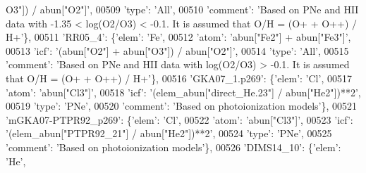 \begin{DoxyCode}
{      O3"]) / abun["O2"]'},
00509                                       \textcolor{stringliteral}{'type'}: \textcolor{stringliteral}{'All'},
00510                                       \textcolor{stringliteral}{'comment'}: \textcolor{stringliteral}{'Based on PNe and HII data with -1.35 < log(O2/O3) < -0.1.
       It is assumed that O/H = (O+ + O++) / H+'}\},
00511                          \textcolor{stringliteral}{'RR05\_4'}: \{\textcolor{stringliteral}{'elem'}: \textcolor{stringliteral}{'Fe'},
00512                                       \textcolor{stringliteral}{'atom'}: \textcolor{stringliteral}{'abun["Fe2"] + abun["Fe3"]'},
00513                                       \textcolor{stringliteral}{'icf'}: \textcolor{stringliteral}{'(abun["O2"] + abun["O3"]) / abun["O2"]'},
00514                                       \textcolor{stringliteral}{'type'}: \textcolor{stringliteral}{'All'},
00515                                       \textcolor{stringliteral}{'comment'}: \textcolor{stringliteral}{'Based on PNe and HII data with log(O2/O3) > -0.1. It is
       assumed that O/H = (O+ + O++) / H+'}\},
00516                          \textcolor{stringliteral}{'GKA07\_1.p269'}: \{\textcolor{stringliteral}{'elem'}: \textcolor{stringliteral}{'Cl'},
00517                                       \textcolor{stringliteral}{'atom'}: \textcolor{stringliteral}{'abun["Cl3"]'},
00518                                       \textcolor{stringliteral}{'icf'}: \textcolor{stringliteral}{'(elem\_abun["direct\_He.23"] / abun["He2"])**2'},
00519                                       \textcolor{stringliteral}{'type'}: \textcolor{stringliteral}{'PNe'},
00520                                       \textcolor{stringliteral}{'comment'}: \textcolor{stringliteral}{'Based on photoionization models'}\},
00521                          \textcolor{stringliteral}{'mGKA07-PTPR92\_p269'}: \{\textcolor{stringliteral}{'elem'}: \textcolor{stringliteral}{'Cl'},
00522                                       \textcolor{stringliteral}{'atom'}: \textcolor{stringliteral}{'abun["Cl3"]'},
00523                                       \textcolor{stringliteral}{'icf'}: \textcolor{stringliteral}{'(elem\_abun["PTPR92\_21"] / abun["He2"])**2'},
00524                                       \textcolor{stringliteral}{'type'}: \textcolor{stringliteral}{'PNe'},
00525                                       \textcolor{stringliteral}{'comment'}: \textcolor{stringliteral}{'Based on photoionization models'}\},
00526                          \textcolor{stringliteral}{'DIMS14\_10'}: \{\textcolor{stringliteral}{'elem'}: \textcolor{stringliteral}{'He'},

\end{DoxyCode}
